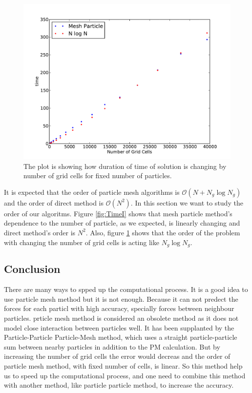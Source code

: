 \documentclass[10pt]{article}
\begin{document}
\begin{figure}[hbt]
  \begin{center}
    \includegraphics[scale=0.6]{Plots/time/timeII.pdf}
    \caption{\label{fig:TimeII} The plot is showing how duration of time of solution is changing by number of grid cells for fixed number of particles.}
  \end{center}
\end{figure}

It is expected that the order of particle mesh algorithms is $\mathcal{O}(N + N_g \log N_g)$ and the order of direct method is $\mathcal{O} (N^2)$. In this section we want to study the order of our algoritms. Figure \ref{fig:TimeI} shows that mesh particle method's dependence to the number of particle, as we expected, is linearly changing and direct method's order is $N^2$. Also, figure \ref{fig:TimeII} shows that the order of the problem with changing the number of grid cells is acting like $N_g \log N_g$.

\subsection{Conclusion}

There are many ways to spped up the computational process. It is a good idea to use particle mesh method but it is not enough. Because it can not predect the forces for each particl with high accuracy, specially forces between neighbour particles. prticle mesh method is considered an obsolete method as it does not model close interaction between particles well. It has been supplanted by the Particle-Particle Particle-Mesh method, which uses a straight particle-particle sum between nearby particles in addition to the PM calculation. But by increasing the number of grid cells the error would decreas and the order of particle mesh method, with fixed number of cells, is linear. So this method help us to speed up the computational process, and one need to combine this method with another method, like particle particle method, to increase the accuracy.\\
\end{document}
